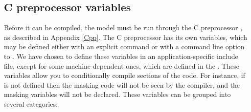 \subsection{C preprocessor variables}
\label{Cpp1}
Before it can be compiled, the model must be run through the C
preprocessor , as described in Appendix \ref{Cpp}. The C
preprocessor has its own variables, which may be defined either with an
explicit  command or with a command line option to
. We have chosen to define these variables in an
application-specific include file, except for some
machine-dependent ones, which are defined in the .
These variables allow you to conditionally compile sections of the
code. For instance, if  is not defined then the masking
code will not be seen by the compiler, and the masking variables will
not be declared. These  variables can be grouped into
several categories:

